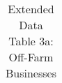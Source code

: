 \begin{longtable}{llcccccccccc}
\caption{Extended Data Table 3a: Off-Farm Businesses} \label{tab:pap__d3_newa} \\                                                                                                                                                                                                                                                                                                                                                                                                                                                                                                                                                                                                                                                                                                                                                                                                                                 
\hline \hline                                                                                                                                                                                                                                                                                                                                                                                                                                                                                                                                                                                                                                                                                                                                                                                                                                                                                                     

\end{longtable}
